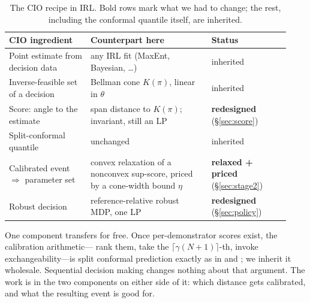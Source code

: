 \documentclass{article}
\begin{document}
\begin{table}[t]
\centering
\small
\caption{The CIO recipe in IRL. Bold rows mark what we had to change; the rest,
including the conformal quantile itself, are inherited.}
\label{tab:recipe}
\begin{tabular}{@{}p{0.27\linewidth}p{0.40\linewidth}p{0.26\linewidth}@{}}
\toprule
CIO ingredient & Counterpart here & Status \\
\midrule
Point estimate from decision data & any IRL fit (MaxEnt, Bayesian, \dots) &
inherited \\
Inverse-feasible set of a decision & Bellman cone $K(\pi)$, linear in $\theta$ &
inherited \\
Score: angle to the estimate & span distance to $K(\pi)$; invariant, still an LP
& \textbf{redesigned} (\S\ref{sec:score}) \\
Split-conformal quantile & unchanged & inherited \\
Calibrated event $\Rightarrow$ parameter set & convex relaxation of a nonconvex
sup-score, priced by a cone-width bound $\eta$ & \textbf{relaxed + priced}
(\S\ref{sec:stage2}) \\
Robust decision & reference-relative robust MDP, one LP & \textbf{redesigned}
(\S\ref{sec:policy}) \\
\bottomrule
\end{tabular}
\end{table}

One component transfers for free. Once per-demonstrator scores exist, the
calibration arithmetic---%
rank them, take the $\lceil\gamma(N+1)\rceil$-th, invoke exchangeability---is
split conformal prediction exactly as in \citet{vovk2005algorithmic} and
\citet{lin2024conformal}; we inherit it wholesale. Sequential decision making
changes nothing about that argument. The work is in the two components on either
side of it: which distance gets calibrated, and what the resulting event is
good for.
\end{document}
